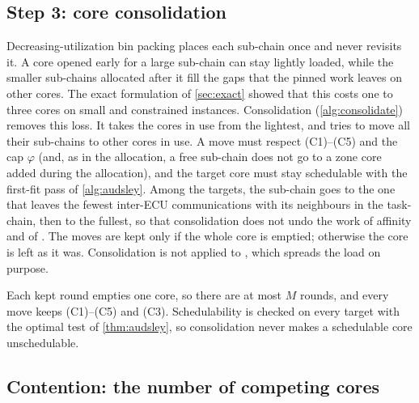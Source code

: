 \subsection{Step 3: core consolidation}
\label{sec:consolidation}

Decreasing-utilization bin packing places each sub-chain once and never
revisits it. A core opened early for a large sub-chain can stay lightly
loaded, while the smaller sub-chains allocated after it fill the gaps that
the pinned work leaves on other cores. The exact formulation of
\cref{sec:exact} showed that this costs one to three cores on small and
constrained instances. Consolidation (\cref{alg:consolidate}) removes this
loss. It takes the cores in use from the lightest, and tries to move all
their sub-chains to other cores in use. A move must respect (C1)--(C5) and
the cap $\varphi$ (and, as in the allocation, a free sub-chain does not go
to a zone core added during the allocation), and the target core must
stay schedulable with the
first-fit pass of \cref{alg:audsley}. Among the targets, the sub-chain goes
to the one that leaves the fewest inter-ECU communications with its
neighbours in the task-chain, then to the fullest, so that consolidation
does not undo the work of affinity and of \CADU. The moves are kept only if
the whole core is emptied; otherwise the core is left as it was.
Consolidation is not applied to \WFDU, which spreads the load on purpose.

\begin{algorithm2e}[t]
\caption{\textsf{Consolidate}$(\pi)$}
\label{alg:consolidate}
\end{algorithm2e}

Each kept round empties one core, so there are at most $M$ rounds, and
every move keeps (C1)--(C5) and (C3). Schedulability is checked on every
target with the optimal test of \cref{thm:audsley}, so consolidation never
makes a schedulable core unschedulable.

\subsection{Contention: the number of competing cores}
\label{sec:contention-method}

